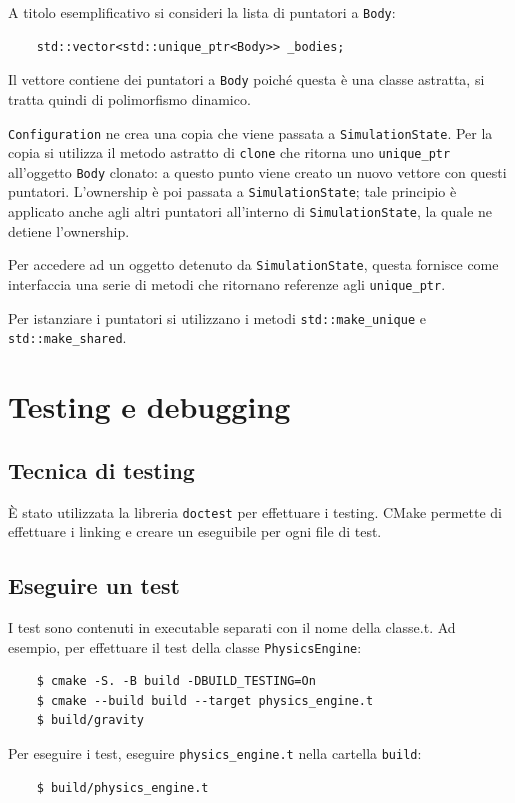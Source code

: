 \documentclass{article}
\begin{document}
A titolo esemplificativo si consideri la lista di puntatori a \verb|Body|:
\begin{verbatim}
    std::vector<std::unique_ptr<Body>> _bodies;
\end{verbatim}

Il vettore contiene dei puntatori a \verb|Body| poiché questa è una classe astratta, si tratta quindi di polimorfismo dinamico.

\verb|Configuration| ne crea una copia che viene passata a \verb|SimulationState|. Per la copia si utilizza il metodo astratto di \verb|clone| che ritorna uno \verb|unique_ptr| all'oggetto \verb|Body| clonato: a questo punto viene creato un nuovo vettore con questi puntatori. L'ownership è poi passata a \verb|SimulationState|; tale principio è applicato anche agli altri puntatori all'interno di \verb|SimulationState|, la quale ne detiene l'ownership.

Per accedere ad un oggetto detenuto da \verb|SimulationState|, questa fornisce come interfaccia una serie di metodi che ritornano referenze agli \verb|unique_ptr|.

Per istanziare i puntatori si utilizzano i metodi \verb|std::make_unique| e \verb|std::make_shared|.

\section{Testing e debugging}
\subsection{Tecnica di testing}
È stato utilizzata la libreria \verb|doctest| per effettuare i testing. CMake permette di effettuare i linking e creare un eseguibile per ogni file di test.

\subsection{Eseguire un test}
I test sono contenuti in executable separati con il nome della classe.t. Ad esempio, per effettuare il test della classe \verb|PhysicsEngine|:
\begin{verbatim}
    $ cmake -S. -B build -DBUILD_TESTING=On
    $ cmake --build build --target physics_engine.t
    $ build/gravity
\end{verbatim}

Per eseguire i test, eseguire \verb|physics_engine.t| nella cartella \verb|build|:
\begin{verbatim}
    $ build/physics_engine.t
\end{verbatim}
\end{document}
